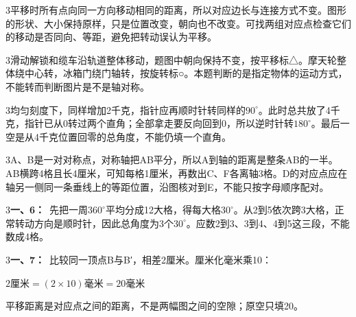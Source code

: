 \documentclass[multi=snippet,border={5bp 20bp 5bp 5bp}]{standalone}
\newenvironment{snippet}[3]{\begin{minipage}{#1bp}\color{answerred}\fontsize{#2}{#3}\selectfont\raggedright}{\end{minipage}}
\begin{document}
\begin{snippet}{505}{11.5}{14}\begin{multicols}{3}\raggedcolumns 平移时所有点向同一方向移动相同的距离，所以对应边长与连接方式不变。图形的形状、大小保持原样，只是位置改变，朝向也不改变。可找两组对应点检查它们的移动是否同向、等距，避免把转动误认为平移。\end{multicols}\end{snippet}
\begin{snippet}{505}{11.5}{14}\begin{multicols}{3}\raggedcolumns 滑动解锁和缆车沿轨道整体移动，题图中朝向保持不变，按平移标△。摩天轮整体绕中心转，冰箱门绕门轴转，按旋转标○。本题判断的是指定物体的运动方式，不能转而判断图片是不是轴对称。\end{multicols}\end{snippet}
\begin{snippet}{505}{11.5}{14}\begin{multicols}{3}\raggedcolumns 均匀刻度下，同样增加2千克，指针应再顺时针转同样的\(90^\circ\)\allowbreak 。此时总共放了4千克，指针已从0转过两个直角；全部拿走要反向回到0，所以逆时针转\(180^\circ\)\allowbreak 。最后一空是从4千克位置回零的总角度，不能仍填一个直角。\end{multicols}\end{snippet}
\begin{snippet}{505}{11.5}{14}\begin{multicols}{3}\raggedcolumns A、B是一对对称点，对称轴把AB平分，所以A到轴的距离是整条AB的一半。AB横跨4格且长4厘米，可知每格1厘米，再数出C、F各离轴3格。D的对应点应在轴另一侧同一条垂线上的等距位置，沿图核对到E，不能只按字母顺序配对。\end{multicols}\end{snippet}
\begin{snippet}{505}{11.5}{14}\begin{multicols}{3}\raggedcolumns \textbf{一、6：}\ 先把一周\(360^\circ\)\allowbreak 平均分成12大格，得每大格\(30^\circ\)\allowbreak 。从2到5依次跨3大格，正常转动方向是顺时针，因此总角度为3个\(30^\circ\)\allowbreak 。应数2到3、3到4、4到5这三段，不能数成4格。\end{multicols}\end{snippet}
\begin{snippet}{505}{11.5}{14}\begin{multicols}{3}\raggedcolumns \textbf{一、7：}\ 比较同一顶点B与B′，相差2厘米。厘米化毫米乘10：\par\noindent\(\displaystyle 2\text{厘米}=(2\times10)\text{毫米}=20\text{毫米}\)\allowbreak \par 平移距离是对应点之间的距离，不是两幅图之间的空隙；原空只填20。\end{multicols}\end{snippet}
\end{document}
